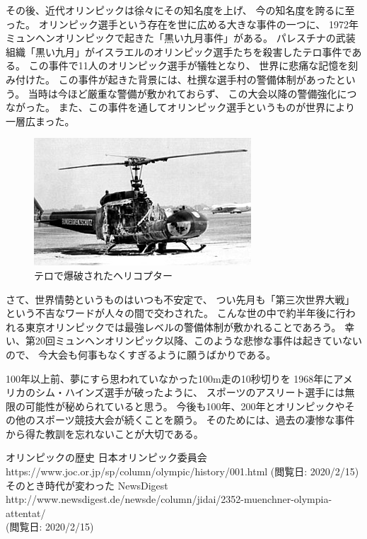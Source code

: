 \documentclass[]{jsarticle}
\begin{document}
その後、近代オリンピックは徐々にその知名度を上げ、
今の知名度を誇るに至った。
オリンピック選手という存在を世に広める大きな事件の一つに、
1972年ミュンヘンオリンピックで起きた「黒い九月事件」がある。
パレスチナの武装組織「黒い九月」がイスラエルのオリンピック選手たちを殺害したテロ事件である。
この事件で11人のオリンピック選手が犠牲となり、
世界に悲痛な記憶を刻み付けた。
この事件が起きた背景には、杜撰な選手村の警備体制があったという。
当時は今ほど厳重な警備が敷かれておらず、
この大会以降の警備強化につながった。
また、この事件を通してオリンピック選手というものが世界により一層広まった。

\begin{figure}[h]
    \centering
    \includegraphics{heli.jpg}
    \caption{テロで爆破されたヘリコプター}
\end{figure}

さて、世界情勢というものはいつも不安定で、
つい先月も「第三次世界大戦」という不吉なワードが人々の間で交わされた。
こんな世の中で約半年後に行われる東京オリンピックでは最強レベルの警備体制が敷かれることであろう。
幸い、第20回ミュンヘンオリンピック以降、このような悲惨な事件は起きていないので、
今大会も何事もなくすぎるように願うばかりである。

100年以上前、夢にすら思われていなかった100m走の10秒切りを
1968年にアメリカのシム・ハインズ選手が破ったように、
スポーツのアスリート選手には無限の可能性が秘められていると思う。
今後も100年、200年とオリンピックやその他のスポーツ競技大会が続くことを願う。
そのためには、過去の凄惨な事件から得た教訓を忘れないことが大切である。

\begin{thebibliography}{99}
     オリンピックの歴史 日本オリンピック委員会 \\
        https://www.joc.or.jp/sp/column/olympic/history/001.html
        (閲覧日: 2020/2/15)
     そのとき時代が変わった NewsDigest \\
        http://www.newsdigest.de/newsde/column/jidai/2352-muenchner-olympia-attentat/ \\
        (閲覧日: 2020/2/15)
\end{thebibliography}
\end{document}
